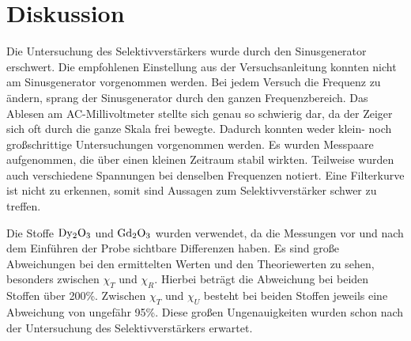 \section{Diskussion}
\label{sec:Diskussion}

Die Untersuchung des Selektivverstärkers wurde durch den Sinusgenerator erschwert.
Die empfohlenen Einstellung aus der Versuchsanleitung konnten nicht am Sinusgenerator vorgenommen werden.
Bei jedem Versuch die Frequenz zu ändern, sprang der Sinusgenerator durch den ganzen Frequenzbereich.
Das Ablesen am AC-Millivoltmeter stellte sich genau so schwierig dar, da der Zeiger sich oft durch die ganze Skala frei bewegte.
Dadurch konnten weder klein- noch großschrittige Untersuchungen vorgenommen werden.
Es wurden Messpaare aufgenommen, die über einen kleinen Zeitraum stabil wirkten.
Teilweise wurden auch verschiedene Spannungen bei denselben Frequenzen notiert.
Eine Filterkurve ist nicht zu erkennen, somit sind Aussagen zum Selektivverstärker schwer zu treffen.

Die Stoffe $\ce{Dy2O3}$ und $\ce{Gd2O3}$ wurden verwendet, da die Messungen vor und nach dem Einführen der Probe sichtbare Differenzen haben.
Es sind große Abweichungen bei den ermittelten Werten und den Theoriewerten zu sehen, besonders zwischen $\chi_T$ und $\chi_R$.
Hierbei beträgt die Abweichung bei beiden Stoffen über 200\%.
Zwischen $\chi_T$ und $\chi_U$ besteht bei beiden Stoffen jeweils eine Abweichung von ungefähr 95\%.
Diese großen Ungenauigkeiten wurden schon nach der Untersuchung des Selektivverstärkers erwartet.

